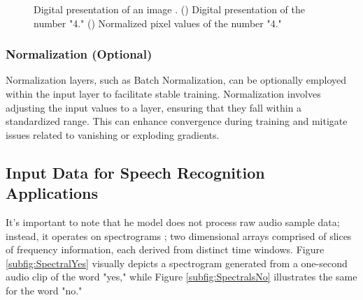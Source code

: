 \begin{figure}[h!]
	\caption{Digital presentation of an image \cite{Sewak:2018}. () Digital presentation of the number "4." () Normalized pixel values of the number "4."}
	\label{fig:DigitalImage}
\end{figure}

\subsubsection{Normalization (Optional)}

Normalization layers, such as Batch Normalization, can be optionally employed within the input layer to facilitate stable training. Normalization involves adjusting the input values to a layer, ensuring that they fall within a standardized range. This can enhance convergence during training and mitigate issues related to vanishing or exploding gradients.


\subsection{Input Data for Speech Recognition Applications}
\label{subsection:InputDataSpeech}

It's important to note that he model does not process raw audio sample data; instead, it operates on spectrograms \cite{Warden:2019}; two dimensional arrays comprised of slices of frequency information, each derived from distinct time windows. Figure \ref{subfig:SpectralYes} visually depicts a spectrogram generated from a one-second audio clip of the word "yes," while Figure \ref{subfig:SpectralsNo} illustrates the same for the word "no."

